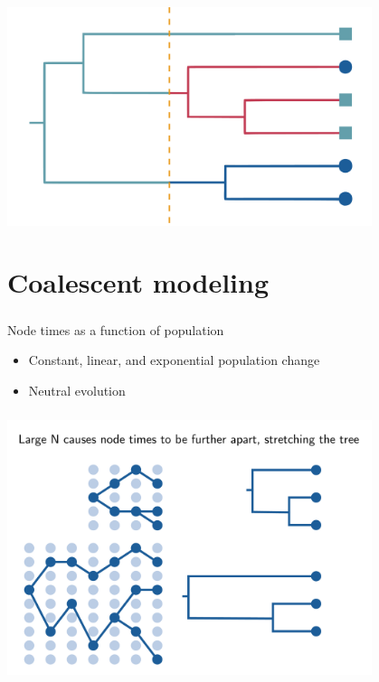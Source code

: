 \documentclass[aspectratio=169]{beamer}
\begin{document}
\begin{frame} \frametitle{\insertsection}

    \begin{center}

        \centering\includegraphics[width=0.8\textwidth]{images/tree-option3}

    \end{center}

\end{frame}


\section{Coalescent modeling}

\begin{frame} \frametitle{\insertsection}
    
    Node times as a function of population

    \begin{itemize}
        \item{Constant, linear, and exponential population change}
        \item{Neutral evolution}
    \end{itemize}

\end{frame}

\begin{frame} \frametitle{\insertsection}

        \centering\includegraphics[width=0.8\textwidth]{images/coalescence}

\end{frame}
\end{document}
